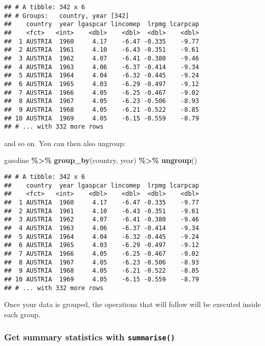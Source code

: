 \documentclass[
]{article}
\newenvironment{Shaded}{\begin{snugshade}}{\end{snugshade}}
\newcommand{\KeywordTok}[1]{\textcolor[rgb]{0.13,0.29,0.53}{\textbf{#1}}}
\newcommand{\NormalTok}[1]{#1}
\newcommand{\OperatorTok}[1]{\textcolor[rgb]{0.81,0.36,0.00}{\textbf{#1}}}
\newcommand{\StringTok}[1]{\textcolor[rgb]{0.31,0.60,0.02}{#1}}
\begin{document}
\begin{verbatim}
## # A tibble: 342 x 6
## # Groups:   country, year [342]
##    country  year lgaspcar lincomep  lrpmg lcarpcap
##    <fct>   <int>    <dbl>    <dbl>  <dbl>    <dbl>
##  1 AUSTRIA  1960     4.17    -6.47 -0.335    -9.77
##  2 AUSTRIA  1961     4.10    -6.43 -0.351    -9.61
##  3 AUSTRIA  1962     4.07    -6.41 -0.380    -9.46
##  4 AUSTRIA  1963     4.06    -6.37 -0.414    -9.34
##  5 AUSTRIA  1964     4.04    -6.32 -0.445    -9.24
##  6 AUSTRIA  1965     4.03    -6.29 -0.497    -9.12
##  7 AUSTRIA  1966     4.05    -6.25 -0.467    -9.02
##  8 AUSTRIA  1967     4.05    -6.23 -0.506    -8.93
##  9 AUSTRIA  1968     4.05    -6.21 -0.522    -8.85
## 10 AUSTRIA  1969     4.05    -6.15 -0.559    -8.79
## # ... with 332 more rows
\end{verbatim}

and so on. You can then also ungroup:

\begin{Shaded}
\begin{Highlighting}[]
\NormalTok{gasoline }\OperatorTok{\%\textgreater{}\%}\StringTok{ }\KeywordTok{group\_by}\NormalTok{(country, year) }\OperatorTok{\%\textgreater{}\%}\StringTok{ }\KeywordTok{ungroup}\NormalTok{()}
\end{Highlighting}
\end{Shaded}

\begin{verbatim}
## # A tibble: 342 x 6
##    country  year lgaspcar lincomep  lrpmg lcarpcap
##    <fct>   <int>    <dbl>    <dbl>  <dbl>    <dbl>
##  1 AUSTRIA  1960     4.17    -6.47 -0.335    -9.77
##  2 AUSTRIA  1961     4.10    -6.43 -0.351    -9.61
##  3 AUSTRIA  1962     4.07    -6.41 -0.380    -9.46
##  4 AUSTRIA  1963     4.06    -6.37 -0.414    -9.34
##  5 AUSTRIA  1964     4.04    -6.32 -0.445    -9.24
##  6 AUSTRIA  1965     4.03    -6.29 -0.497    -9.12
##  7 AUSTRIA  1966     4.05    -6.25 -0.467    -9.02
##  8 AUSTRIA  1967     4.05    -6.23 -0.506    -8.93
##  9 AUSTRIA  1968     4.05    -6.21 -0.522    -8.85
## 10 AUSTRIA  1969     4.05    -6.15 -0.559    -8.79
## # ... with 332 more rows
\end{verbatim}

Once your data is grouped, the operations that will follow will be executed inside each group.

\hypertarget{get-summary-statistics-with-summarise}{%
\subsubsection{\texorpdfstring{Get summary statistics with \texttt{summarise()}}{Get summary statistics with summarise()}}\label{get-summary-statistics-with-summarise}}
\end{document}
